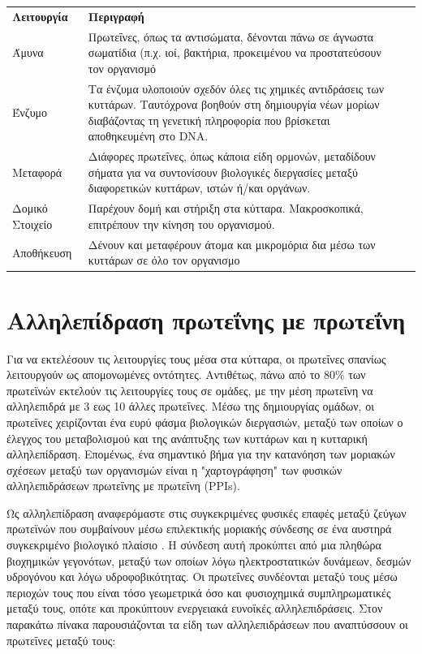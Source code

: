 \begingroup
\centering
\begin{tabularx}{1\textwidth} { 
  | >{\raggedright\arraybackslash}X 
  | >{\centering\arraybackslash}X 
  | >{\raggedleft\arraybackslash}X | }
  \hline
 \multicolumn{2}{|c|}{Λειτουργίες Πρωτεϊνών} \\
 \hline
 \textbf{Λειτουργία} & \textbf{Περιγραφή}\\
 \hline
 Άμυνα  & Πρωτεΐνες, όπως τα αντισώματα, δένονται πάνω σε άγνωστα σωματίδια (π.χ. ιοί, βακτήρια, προκειμένου να προστατεύσουν τον οργανισμό \\
\hline
Ένζυμο & Τα ένζυμα υλοποιούν σχεδόν όλες τις χημικές αντιδράσεις των κυττάρων. Ταυτόχρονα βοηθούν στη δημιουργία νέων μορίων διαβάζοντας τη γενετική πληροφορία που βρίσκεται αποθηκευμένη στο DNA.\\
\hline
Μεταφορά & Διάφορες πρωτεΐνες, όπως κάποια είδη ορμονών, μεταδίδουν σήματα για να συντονίσουν βιολογικές διεργασίες μεταξύ διαφορετικών κυττάρων, ιστών ή/και οργάνων. \\
\hline
Δομικό Στοιχείο & Παρέχουν δομή και στήριξη στα κύτταρα. Μακροσκοπικά, επιτρέπουν την κίνηση του οργανισμού. \\
\hline
Αποθήκευση & Δένουν και μεταφέρουν άτομα και μικρομόρια δια μέσω των κυττάρων σε όλο τον οργανισμο \\
\hline
\end{tabularx}
\label{Λειτουργίες πρωτεϊνών}
\endgroup


\section{Αλληλεπίδραση πρωτεΐνης με πρωτεΐνη}

Για να εκτελέσουν τις λειτουργίες τους μέσα στα κύτταρα, οι πρωτεΐνες σπανίως λειτουργούν ως απομονωμένες οντότητες. Αντιθέτως, πάνω από το 80\% των πρωτεϊνών εκτελούν τις λειτουργίες τους σε ομάδες\cite{Yanagida2002}, με την μέση πρωτεΐνη να αλληλεπιδρά με 3 εως 10 άλλες πρωτεΐνες\cite{Northey2017}. Μέσω της δημιουργίας ομάδων, οι πρωτεΐνες χειρίζονται ένα ευρύ φάσμα βιολογικών διεργασιών, μεταξύ των οποίων ο έλεγχος του μεταβολισμού και της ανάπτυξης των κυττάρων και η κυτταρική αλληλεπίδραση\cite{Rao2014}. Επομένως, ένα σημαντικό βήμα για την κατανόηση των μοριακών σχέσεων μεταξύ των οργανισμών είναι η "χαρτογράφηση" των φυσικών αλληλεπιδράσεων πρωτεΐνης με πρωτεΐνη (PPIs). 

\smallskip
Ως αλληλεπίδραση αναφερόμαστε στις συγκεκριμένες φυσικές επαφές μεταξύ ζεύγων πρωτεϊνών που συμβαίνουν μέσω επιλεκτικής μοριακής σύνδεσης σε ένα αυστηρά συγκεκριμένο βιολογικό πλαίσιο \cite{Rivas2010}. Η σύνδεση αυτή προκύπτει από μια πληθώρα βιοχημικών γεγονότων, μεταξύ των οποίων λόγω ηλεκτροστατικών δυνάμεων, δεσμών υδρογόνου και λόγω υδροφοβικότητας. Οι πρωτεΐνες συνδέονται μεταξύ τους μέσω περιοχών τους που είναι τόσο γεωμετρικά όσο και φυσιοχημικά συμπληρωματικές μεταξύ τους, οπότε και προκύπτουν ενεργειακά ευνοϊκές αλληλεπιδράσεις. Στον παρακάτω πίνακα παρουσιάζονται τα είδη των αλληλεπιδράσεων που αναπτύσσουν οι πρωτεΐνες μεταξύ τους:


